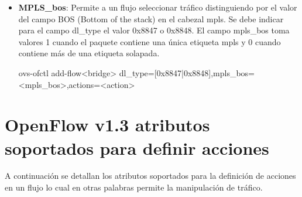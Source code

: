 \begin{itemize}
\item \textbf{MPLS\_bos}: Permite a un flujo seleccionar tr\'afico distinguiendo por el valor del campo BOS (Bottom of the stack) en el cabezal mpls. Se debe indicar para el campo dl\_type el valor 0x8847 o 0x8848. El campo mpls\_bos toma valores 1 cuando el paquete contiene una única etiqueta mpls y 0 cuando contiene m\'as de una etiqueta solapada.

\begin{center}
ovs-ofctl add-flow<bridge> dl\_type=[0x8847|0x8848],mpls\_bos=<mpls\_bos>,actions=<action>
\end{center}

\end{itemize}

\section{OpenFlow v1.3 atributos soportados para definir acciones}
A continuaci\'on se detallan los atributos soportados para la definici\'on de acciones en un flujo lo cual en otras palabras permite la manipulaci\'on de tr\'afico.

